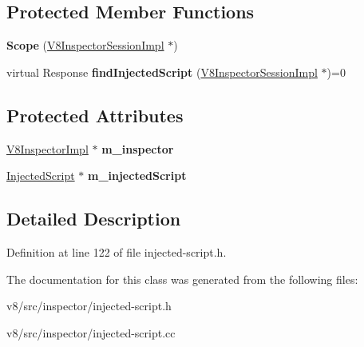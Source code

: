 \subsection*{Protected Member Functions}
\begin{DoxyCompactItemize}
\item 
\mbox{\label{classv8__inspector_1_1InjectedScript_1_1Scope_a8072e9d02c3f098a44d752c4223b6546}} 
{\bfseries Scope} (\mbox{\hyperlink{classv8__inspector_1_1V8InspectorSessionImpl}{V8\+Inspector\+Session\+Impl}} $\ast$)
\item 
\mbox{\label{classv8__inspector_1_1InjectedScript_1_1Scope_ace9c1643f03b948a245fd18c5ff15e22}} 
virtual Response {\bfseries find\+Injected\+Script} (\mbox{\hyperlink{classv8__inspector_1_1V8InspectorSessionImpl}{V8\+Inspector\+Session\+Impl}} $\ast$)=0
\end{DoxyCompactItemize}
\subsection*{Protected Attributes}
\begin{DoxyCompactItemize}
\item 
\mbox{\label{classv8__inspector_1_1InjectedScript_1_1Scope_ad9031140b715c3a75ee74a6120a5a5f6}} 
\mbox{\hyperlink{classv8__inspector_1_1V8InspectorImpl}{V8\+Inspector\+Impl}} $\ast$ {\bfseries m\+\_\+inspector}
\item 
\mbox{\label{classv8__inspector_1_1InjectedScript_1_1Scope_adff5f2b2e976932540cef7d5634ccd85}} 
\mbox{\hyperlink{classv8__inspector_1_1InjectedScript}{Injected\+Script}} $\ast$ {\bfseries m\+\_\+injected\+Script}
\end{DoxyCompactItemize}


\subsection{Detailed Description}


Definition at line 122 of file injected-\/script.\+h.



The documentation for this class was generated from the following files\+:\begin{DoxyCompactItemize}
\item 
v8/src/inspector/injected-\/script.\+h\item 
v8/src/inspector/injected-\/script.\+cc\end{DoxyCompactItemize}
